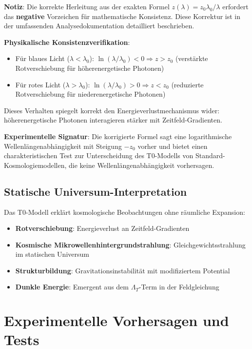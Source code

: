 \documentclass[12pt,a4paper]{article}
\theoremstyle{definition}
\theoremstyle{remark}
\begin{document}
	\textbf{Notiz}: Die korrekte Herleitung aus der exakten Formel $z(\lambda) = z_0 \lambda_0/\lambda$ erfordert das \textbf{negative} Vorzeichen für mathematische Konsistenz. Diese Korrektur ist in der umfassenden Analysedokumentation \cite{pascher_derivation_beta_2025} detailliert beschrieben.
	
	\textbf{Physikalische Konsistenzverifikation}:
	\begin{itemize}
		\item Für blaues Licht ($\lambda < \lambda_0$): $\ln(\lambda/\lambda_0) < 0 \Rightarrow z > z_0$ (verstärkte Rotverschiebung für höherenergetische Photonen)
		\item Für rotes Licht ($\lambda > \lambda_0$): $\ln(\lambda/\lambda_0) > 0 \Rightarrow z < z_0$ (reduzierte Rotverschiebung für niederenergetische Photonen)
	\end{itemize}
	
	Dieses Verhalten spiegelt korrekt den Energieverlustmechanismus wider: höherenergetische Photonen interagieren stärker mit Zeitfeld-Gradienten.
	
	\textbf{Experimentelle Signatur}: Die korrigierte Formel sagt eine logarithmische Wellenlängenabhängigkeit mit Steigung $-z_0$ vorher und bietet einen charakteristischen Test zur Unterscheidung des T0-Modells von Standard-Kosmologiemodellen, die keine Wellenlängenabhängigkeit vorhersagen.
	
	\subsection{Statische Universum-Interpretation}
	\label{subsec:statisches_universum}
	
	Das T0-Modell erklärt kosmologische Beobachtungen ohne räumliche Expansion:
	\begin{itemize}
		\item \textbf{Rotverschiebung}: Energieverlust an Zeitfeld-Gradienten
		\item \textbf{Kosmische Mikrowellenhintergrundstrahlung}: Gleichgewichtsstrahlung im statischen Universum
		\item \textbf{Strukturbildung}: Gravitationsinstabilität mit modifiziertem Potential
		\item \textbf{Dunkle Energie}: Emergent aus dem $\Lambda_T$-Term in der Feldgleichung
	\end{itemize}
	
	\section{Experimentelle Vorhersagen und Tests}
	\label{sec:experimentelle_vorhersagen}
	
\end{document}
